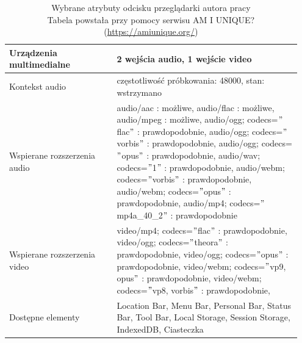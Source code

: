 \begin{table}[p]
\begin{tabular}{|p{0.35\linewidth} | p{0.6\linewidth}|}
        Urządzenia multimedialne     & 2 wejścia audio, 1 wejście video                                                                                                                                                                                                                                                                                                                                                                                                              \\ \hline
        Kontekst audio               & częstotliwość próbkowania: 48000, stan: wstrzymano                                                                                                                                                                                                                                                                                                                                                                                            \\ \hline
        Wspierane rozszerzenia audio & audio/aac : możliwe, audio/flac : możliwe, audio/mpeg : możliwe, audio/ogg; codecs=\("\)flac\("\)  : prawdopodobnie, audio/ogg; codecs=\("\)vorbis\("\) : prawdopodobnie, audio/ogg; codecs=\("\)opus\("\) : prawdopodobnie, audio/wav; codecs=\("\)1\("\) : prawdopodobnie, audio/webm; codecs=\("\)vorbis\("\) : prawdopodobnie, audio/webm; codecs=\("\)opus\("\) : prawdopodobnie, audio/mp4; codecs=\("\)mp4a\_40\_2\("\) : prawdopodobnie \\ \hline
        Wspierane rozszerzenia video & video/mp4; codecs=\("\)flac\("\) : prawdopodobnie, video/ogg; codecs=\("\)theora\("\) : prawdopodobnie, video/ogg; codecs=\("\)opus\("\) : prawdopodobnie, video/webm; codecs=\("\)vp9, opus\("\) : prawdopodobnie, video/webm; codecs=\("\)vp8, vorbis\("\) : prawdopodobnie,                                                                                                                                                                \\ \hline
        Dostępne elementy            & Location Bar, Menu Bar, Personal Bar, Status Bar, Tool Bar, Local Storage, Session Storage, IndexedDB, Ciasteczka                                                                                                                                                                                                                                                                                                                             \\ \hline
    \end{tabular}
    \caption{Wybrane atrybuty odcisku przeglądarki autora pracy\\Tabela powstała przy pomocy serwisu AM I UNIQUE?\\(\url{https://amiunique.org/})}
    \label{tab:http-js-attributes}
\end{table}

